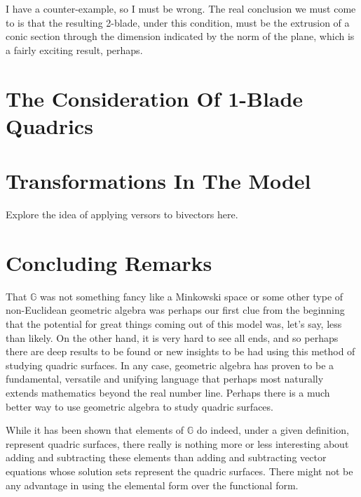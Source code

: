 \documentclass{ecgd-l}
\newcommand{\G}{\mathbb{G}}
\theoremstyle{definition}
\theoremstyle{remark}
\numberwithin{equation}{section}
\begin{document}
I have a counter-example, so I must be wrong.  The real conclusion we must
come to is that the resulting 2-blade, under this condition, must be the
extrusion of a conic section through the dimension indicated by the
norm of the plane, which is a fairly exciting result, perhaps.



\section{The Consideration Of 1-Blade Quadrics}

\section{Transformations In The Model}

Explore the idea of applying versors to bivectors here.


\section{Concluding Remarks}

That $\G$ was not something fancy like a Minkowski space or some other
type of non-Euclidean geometric algebra was perhaps our first clue from
the beginning that the potential for great things coming out of this model
was, let's say, less than likely.  On the other hand, it is very hard to see
all ends, and so perhaps there are deep results to be found or new insights
to be had using this method of studying quadric surfaces.  In any case,
geometric algebra has proven to be a fundamental, versatile and unifying
language that perhaps most naturally extends mathematics beyond the real number line.  Perhaps
there is a much better way to use geometric algebra to study quadric surfaces.

While it has been shown that elements of $\G$ do indeed, under a given
definition, represent quadric surfaces, there really is nothing more or less
interesting about adding and subtracting these elements than adding and
subtracting vector equations whose solution sets represent the quadric surfaces.
There might not be any advantage in using the elemental form over the
functional form.





\end{document}

